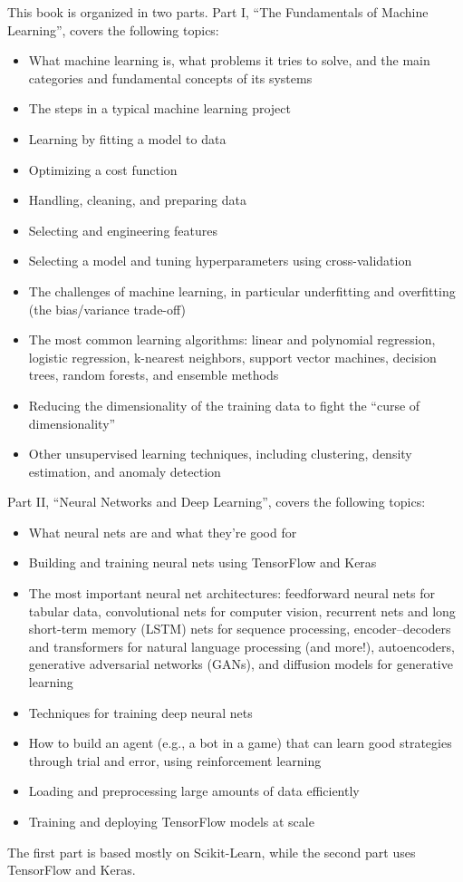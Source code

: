 \documentclass[12pt, oneside]{book}
\begin{document}
This book is organized in two parts. Part I, “The Fundamentals of Machine Learning”, covers the following topics:
\begin{itemize}
    \item What machine learning is, what problems it tries to solve, and the main categories and fundamental concepts of its systems
    \item The steps in a typical machine learning project
    \item Learning by fitting a model to data
    \item Optimizing a cost function
    \item Handling, cleaning, and preparing data
    \item Selecting and engineering features
    \item Selecting a model and tuning hyperparameters using cross-validation
    \item The challenges of machine learning, in particular underfitting and overfitting (the bias/variance trade-off)
    \item The most common learning algorithms: linear and polynomial regression, logistic regression, k-nearest neighbors, support vector machines, decision trees, random forests, and ensemble methods
    \item Reducing the dimensionality of the training data to fight the “curse of dimensionality”
    \item Other unsupervised learning techniques, including clustering, density estimation, and anomaly detection
\end{itemize}
Part II, “Neural Networks and Deep Learning”, covers the following topics:
\begin{itemize}
    \item What neural nets are and what they’re good for
    \item Building and training neural nets using TensorFlow and Keras
    \item The most important neural net architectures: feedforward neural nets for tabular data, convolutional nets for computer vision, recurrent nets and long short-term memory (LSTM) nets for sequence processing, encoder–decoders and transformers for natural language processing (and more!), autoencoders, generative adversarial networks (GANs), and diffusion models for generative learning
    \item Techniques for training deep neural nets
    \item How to build an agent (e.g., a bot in a game) that can learn good strategies through trial and error, using reinforcement learning
    \item Loading and preprocessing large amounts of data efficiently
    \item Training and deploying TensorFlow models at scale
\end{itemize}
The first part is based mostly on Scikit-Learn, while the second part uses TensorFlow and Keras.
\end{document}
